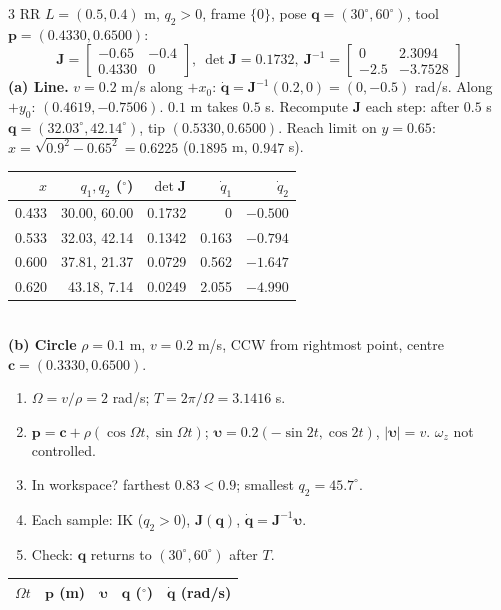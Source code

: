 \begin{multicols}{3}
RR $L=(0.5,0.4)$ m, $q_2>0$, frame $\{0\}$, pose $\mathbf q=(30^\circ,60^\circ)$, tool $\mathbf p=(0.4330,0.6500)$:
\[\mathbf J=\begin{bmatrix}-0.65&-0.4\\0.4330&0\end{bmatrix},\ \det\mathbf J=0.1732,\ \mathbf J^{-1}=\begin{bmatrix}0&2.3094\\-2.5&-3.7528\end{bmatrix}\]
\textbf{(a) Line.} $v=0.2$ m/s along $+x_0$: $\dot{\mathbf q}=\mathbf J^{-1}(0.2,0)=(0,-0.5)$ rad/s. Along $+y_0$: $(0.4619,-0.7506)$. $0.1$ m takes $0.5$ s. Recompute $\mathbf J$ each step: after $0.5$ s $\mathbf q=(32.03^\circ,42.14^\circ)$, tip $(0.5330,0.6500)$. Reach limit on $y=0.65$: $x=\sqrt{0.9^2-0.65^2}=0.6225$ ($0.1895$ m, $0.947$ s).\\
{\small\begin{tabular}{@{}rrrrr@{}}\toprule $x$&$q_1,q_2$ ($^\circ$)&$\det\mathbf J$&$\dot q_1$&$\dot q_2$\\\midrule
0.433&30.00, 60.00&0.1732&0&$-0.500$\\0.533&32.03, 42.14&0.1342&0.163&$-0.794$\\0.600&37.81, 21.37&0.0729&0.562&$-1.647$\\0.620&43.18, 7.14&0.0249&2.055&$-4.990$\\\bottomrule\end{tabular}}\\
\textbf{(b) Circle} $\rho=0.1$ m, $v=0.2$ m/s, CCW from rightmost point, centre $\mathbf c=(0.3330,0.6500)$.
\begin{recipe}[circle]
\begin{enumerate}
\item $\Omega=v/\rho=2$ rad/s; $T=2\pi/\Omega=3.1416$ s.
\item $\mathbf p=\mathbf c+\rho(\cos\Omega t,\sin\Omega t)$; $\boldsymbol\upsilon=0.2(-\sin2t,\cos2t)$, $|\boldsymbol\upsilon|=v$. $\omega_z$ not controlled.
\item In workspace? farthest $0.83<0.9$; smallest $q_2=45.7^\circ$.
\item Each sample: IK ($q_2>0$), $\mathbf J(\mathbf q)$, $\dot{\mathbf q}=\mathbf J^{-1}\boldsymbol\upsilon$.
\item Check: $\mathbf q$ returns to $(30^\circ,60^\circ)$ after $T$.
\end{enumerate}
\end{recipe}
{\small\begin{tabular}{@{}rrrrr@{}}\toprule $\Omega t$&$\mathbf p$ (m)&$\boldsymbol\upsilon$&$\mathbf q$ ($^\circ$)&$\dot{\mathbf q}$ (rad/s)\\\midrule

\end{tabular}}
\end{multicols}
